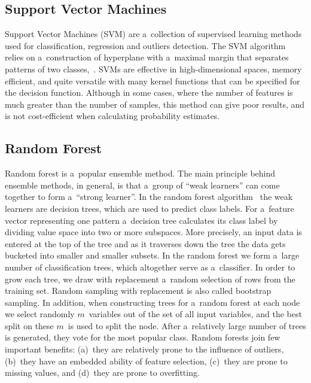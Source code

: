 \documentclass{llncs}
\begin{document}
\subsection{Support Vector Machines}

Support Vector Machines (SVM) are a~collection of supervised learning methods used for classification, regression and outliers detection. The SVM algorithm relies on a~construction of hyperplane with a~maximal margin that separates patterns of two classes,~\cite{CortesVapnik1995}. SVMs are effective in high-dimensional spaces, memory efficient, and quite versatile with many kernel functions that can be specified for the decision function. Although in some cases, where the number of features is much greater than the number of samples, this method can give poor results, and is not cost-efficient when calculating probability estimates.
\vspace{-3pt}

\subsection{Random Forest}

Random forest is a~popular ensemble method. The main principle behind ensemble methods, in general, is that a~group of ``weak learners'' can come together to form a~``strong learner''. In the random forest algorithm~\cite{Breiman2001} the weak learners are decision trees, which are used to predict class labels. For a~feature vector representing one pattern a~decision tree calculates its class label by dividing value space into two or more subspaces. More precisely, an input data is entered at the top of the tree and as it traverses down the tree the data gets bucketed into smaller and smaller subsets. In the random forest we form a~large number of classification trees, which altogether serve as a~classifier. In order to grow each tree, we draw with replacement a~random selection of rows from the training set. Random sampling with replacement is also called bootstrap sampling. In addition, when constructing trees for a~random forest at each node we select randomly $m$~variables out of the set of all input variables, and the best split on these $m$~is used to split the node. After a~relatively large number of trees is generated, they vote for the most popular class. Random forests join few important benefits: (a)~they are relatively prone to the influence of outliers, (b)~they have an embedded ability of feature selection, (c)~they are prone to missing values, and (d)~they are prone to overfitting. 
\end{document}
